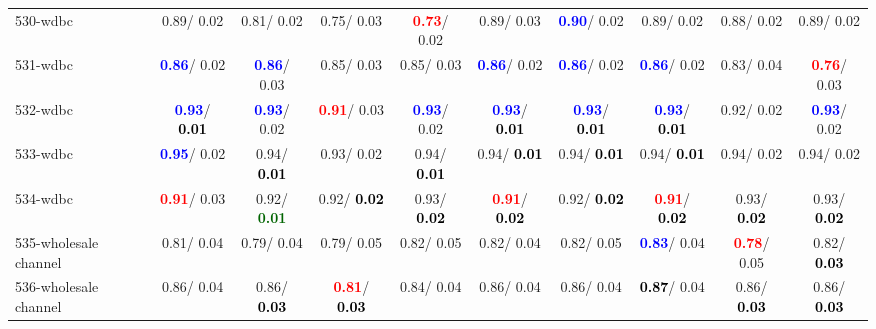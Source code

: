 \begin{table}[h]
\begin{center}
{\begin{tabular}{lc|c|c|c|c|c|c|c|c}
530-wdbc &   0.89/  0.02 &   0.81/  0.02 &   0.75/  0.03 & \textcolor{red}{\textbf{  0.73}}/  0.02 &   0.89/  0.03 & \textcolor{blue}{\textbf{  0.90}}/  0.02 &   0.89/  0.02 &   0.88/  0.02 &   0.89/  0.02 \\
531-wdbc & \textcolor{blue}{\textbf{  0.86}}/  0.02 & \textcolor{blue}{\textbf{  0.86}}/  0.03 &   0.85/  0.03 &   0.85/  0.03 & \textcolor{blue}{\textbf{  0.86}}/  0.02 & \textcolor{blue}{\textbf{  0.86}}/  0.02 & \textcolor{blue}{\textbf{  0.86}}/  0.02 &   0.83/  0.04 & \textcolor{red}{\textbf{  0.76}}/  0.03 \\
532-wdbc & \textcolor{blue}{\textbf{  0.93}}/\textcolor{black}{\textbf{  0.01}} & \textcolor{blue}{\textbf{  0.93}}/  0.02 & \textcolor{red}{\textbf{  0.91}}/  0.03 & \textcolor{blue}{\textbf{  0.93}}/  0.02 & \textcolor{blue}{\textbf{  0.93}}/\textcolor{black}{\textbf{  0.01}} & \textcolor{blue}{\textbf{  0.93}}/\textcolor{black}{\textbf{  0.01}} & \textcolor{blue}{\textbf{  0.93}}/\textcolor{black}{\textbf{  0.01}} &   0.92/  0.02 & \textcolor{blue}{\textbf{  0.93}}/  0.02 \\
533-wdbc & \textcolor{blue}{\textbf{  0.95}}/  0.02 &   0.94/\textcolor{black}{\textbf{  0.01}} &   0.93/  0.02 &   0.94/\textcolor{black}{\textbf{  0.01}} &   0.94/\textcolor{black}{\textbf{  0.01}} &   0.94/\textcolor{black}{\textbf{  0.01}} &   0.94/\textcolor{black}{\textbf{  0.01}} &   0.94/  0.02 &   0.94/  0.02 \\ \hline
534-wdbc & \textcolor{red}{\textbf{  0.91}}/  0.03 &   0.92/\textcolor{darkgreen}{\textbf{  0.01}} &   0.92/\textcolor{black}{\textbf{  0.02}} &   0.93/\textcolor{black}{\textbf{  0.02}} & \textcolor{red}{\textbf{  0.91}}/\textcolor{black}{\textbf{  0.02}} &   0.92/\textcolor{black}{\textbf{  0.02}} & \textcolor{red}{\textbf{  0.91}}/\textcolor{black}{\textbf{  0.02}} &   0.93/\textcolor{black}{\textbf{  0.02}} &   0.93/\textcolor{black}{\textbf{  0.02}} \\
535-wholesale channel &   0.81/  0.04 &   0.79/  0.04 &   0.79/  0.05 &   0.82/  0.05 &   0.82/  0.04 &   0.82/  0.05 & \textcolor{blue}{\textbf{  0.83}}/  0.04 & \textcolor{red}{\textbf{  0.78}}/  0.05 &   0.82/\textcolor{black}{\textbf{  0.03}} \\
536-wholesale channel &   0.86/  0.04 &   0.86/\textcolor{black}{\textbf{  0.03}} & \textcolor{red}{\textbf{  0.81}}/\textcolor{black}{\textbf{  0.03}} &   0.84/  0.04 &   0.86/  0.04 &   0.86/  0.04 & \textcolor{black}{\textbf{  0.87}}/  0.04 &   0.86/\textcolor{black}{\textbf{  0.03}} &   0.86/\textcolor{black}{\textbf{  0.03}} \\

\end{tabular}}
\end{center}
\end{table}
